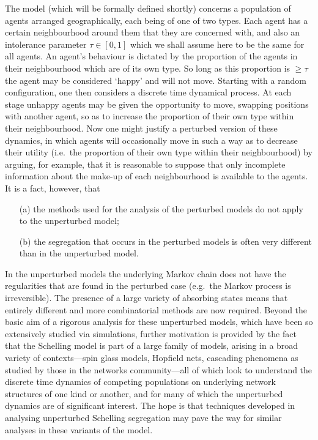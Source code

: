 \documentclass[11pt]{article}
\theoremstyle{plain}
\numberwithin{equation}{subsection}
\begin{document}
The model (which will be formally defined shortly) concerns a population of agents arranged geographically, each being of one of two types. Each agent has a certain neighbourhood around them that they are concerned with, and also an intolerance parameter $\tau\in [0,1]$ which we shall assume here to be the same for all agents. An agent's behaviour is dictated by the proportion of the agents in their neighbourhood which are of its own type. So long as  this proportion is $\geq \tau$ the agent may be considered `happy' and will not move.  Starting with a random configuration,  one then considers a discrete time dynamical process.  At each stage unhappy agents  may be  given the opportunity to move, swapping positions with another agent,  so as to increase the proportion of their own type within their neighbourhood. Now one might  justify  a perturbed version of these dynamics,  in which  agents will occasionally move in such a way as to decrease their utility (i.e.\  the  proportion of their own type within their neighbourhood) by arguing, for example, that it is reasonable to suppose that only incomplete information about the make-up of each neighbourhood is available to the agents. 
It is a fact, however,  that 
\begin{itemize}
\item[(a)] the methods used for the analysis of
the perturbed models do not apply to the unperturbed model; 
\item[(b)] the segregation that occurs in the perturbed models is often very
different than in the unperturbed model.
\end{itemize}
In the unperturbed models the underlying 
Markov chain does not have the regularities that are found in the perturbed case
(e.g.\ the Markov process is irreversible).  The presence of a large variety of absorbing states means that entirely different and more combinatorial methods are now required. Beyond the basic aim of a rigorous analysis for these unperturbed models, which have been so extensively studied via simulations, further motivation is provided by the fact that the Schelling model is part of a large family of models, arising in a broad variety of contexts---spin glass models, Hopfield nets, cascading phenomena as studied by those in the networks community---all of which look to understand the discrete time dynamics of competing populations on underlying network structures of one kind or another,  and for many of which the unperturbed dynamics are of significant interest.  The hope is that techniques developed in analysing  unperturbed Schelling segregation may pave the way for similar analyses in these variants of the model.  
\end{document}
